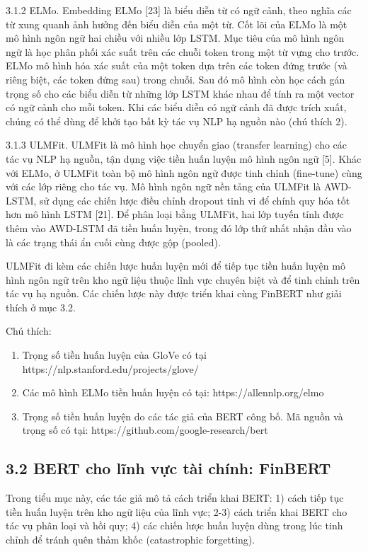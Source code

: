3.1.2 ELMo. Embedding ELMo {[}23{]} là biểu diễn từ có ngữ cảnh, theo nghĩa các từ xung quanh ảnh hưởng đến biểu diễn của một từ. Cốt lõi của ELMo là một mô hình ngôn ngữ hai chiều với nhiều lớp LSTM. Mục tiêu của mô hình ngôn ngữ là học phân phối xác suất trên các chuỗi token trong một từ vựng cho trước. ELMo mô hình hóa xác suất của một token dựa trên các token đứng trước (và riêng biệt, các token đứng sau) trong chuỗi. Sau đó mô hình còn học cách gán trọng số cho các biểu diễn từ những lớp LSTM khác nhau để tính ra một vector có ngữ cảnh cho mỗi token. Khi các biểu diễn có ngữ cảnh đã được trích xuất, chúng có thể dùng để khởi tạo bất kỳ tác vụ NLP hạ nguồn nào (chú thích 2).

3.1.3 ULMFit. ULMFit là mô hình học chuyển giao (transfer learning) cho các tác vụ NLP hạ nguồn, tận dụng việc tiền huấn luyện mô hình ngôn ngữ {[}5{]}. Khác với ELMo, ở ULMFit toàn bộ mô hình ngôn ngữ được tinh chỉnh (fine-tune) cùng với các lớp riêng cho tác vụ. Mô hình ngôn ngữ nền tảng của ULMFit là AWD-LSTM, sử dụng các chiến lược điều chỉnh dropout tinh vi để chính quy hóa tốt hơn mô hình LSTM {[}21{]}. Để phân loại bằng ULMFit, hai lớp tuyến tính được thêm vào AWD-LSTM đã tiền huấn luyện, trong đó lớp thứ nhất nhận đầu vào là các trạng thái ẩn cuối cùng được gộp (pooled).

ULMFit đi kèm các chiến lược huấn luyện mới để tiếp tục tiền huấn luyện mô hình ngôn ngữ trên kho ngữ liệu thuộc lĩnh vực chuyên biệt và để tinh chỉnh trên tác vụ hạ nguồn. Các chiến lược này được triển khai cùng FinBERT như giải thích ở mục 3.2.

Chú thích:

\begin{enumerate}
\def\labelenumi{\arabic{enumi}.}
\item
  Trọng số tiền huấn luyện của GloVe có tại https://nlp.stanford.edu/projects/glove/
\item
  Các mô hình ELMo tiền huấn luyện có tại: https://allennlp.org/elmo
\item
  Trọng số tiền huấn luyện do các tác giả của BERT công bố. Mã nguồn và trọng số có tại: https://github.com/google-research/bert
\end{enumerate}

\subsection{3.2 BERT cho lĩnh vực tài chính: FinBERT}

Trong tiểu mục này, các tác giả mô tả cách triển khai BERT: 1) cách tiếp tục tiền huấn luyện trên kho ngữ liệu của lĩnh vực; 2-3) cách triển khai BERT cho tác vụ phân loại và hồi quy; 4) các chiến lược huấn luyện dùng trong lúc tinh chỉnh để tránh quên thảm khốc (catastrophic forgetting).

